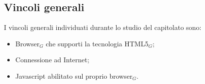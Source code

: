 \subsection{Vincoli generali}
I vincoli generali individuati durante lo studio del capitolato sono:
\begin{itemize}
\item Browser$_G$ che supporti la tecnologia HTML5$_G$;
\item Connessione ad Internet;
\item Javascript abilitato sul proprio browser$_G	$.
\end{itemize}

